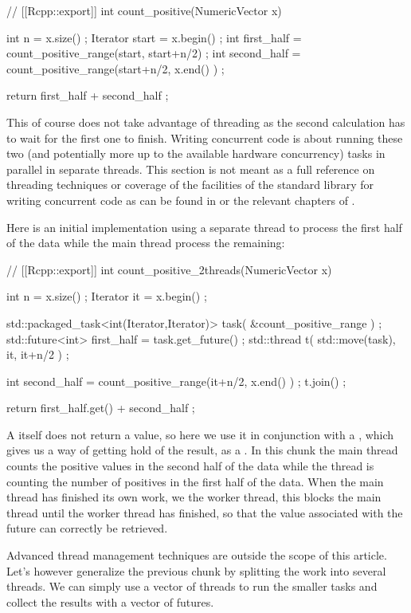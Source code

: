 \begin{example}
// [[Rcpp::export]]
int count_positive(NumericVector x){
  int n = x.size() ;
  Iterator start  = x.begin() ;
  int first_half  = count_positive_range(start, start+n/2) ;
  int second_half = count_positive_range(start+n/2, x.end() ) ;
  
  return first_half + second_half ; 
}
\end{example}

This of course does not take advantage of threading as the second 
calculation has to wait for the first one to finish. Writing concurrent 
code is about running these two (and potentially more up to the available
hardware concurrency) tasks in parallel in separate threads. 
This section is not meant as a full reference on threading techniques
or coverage of the facilities of the standard library for writing 
concurrent code as can be found in \citep{williams2012} or the 
relevant chapters of \citep{Stroustrup2013}.

Here is an initial implementation using a separate thread to process
the first half of the data while the main thread process the remaining: 

\begin{example}
// [[Rcpp::export]]
int count_positive_2threads(NumericVector x){
  int n = x.size() ;
  Iterator it = x.begin() ;
                                         
  std::packaged_task<int(Iterator,Iterator)> task( &count_positive_range ) ;
  std::future<int> first_half = task.get_future() ;
  std::thread t( std::move(task), it, it+n/2 ) ;            
  
  int second_half = count_positive_range(it+n/2, x.end() ) ;
  t.join() ;
  
  return first_half.get() + second_half ;
}
\end{example}

A  itself does not return a value, so here we use it in conjunction
with a , which gives us a way of getting hold of the result, 
as a . In this chunk the main thread counts the positive
values in the second half of the data while the thread  is counting the 
number of positives in the first half of the data. When the main thread has finished
its own work, we  the worker thread, this blocks the main thread until
the worker thread has finished, so that the value associated with the
future can correctly be retrieved. 

Advanced thread management techniques are outside the scope of this 
article. Let's however generalize the previous chunk by splitting the work 
into several threads. We can simply use a vector of threads to run the smaller
tasks and collect the results with a vector of futures. 

